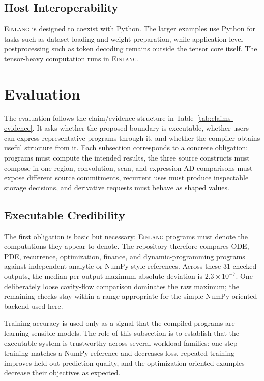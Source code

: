 \documentclass[sigplan,screen,nonacm]{acmart}
\newcommand{\einlang}{\textsc{Einlang}}
\begin{document}
\subsection{Host Interoperability}

\einlang{} is designed to coexist with Python. The larger examples use Python for tasks such as dataset loading and weight preparation, while application-level postprocessing such as token decoding remains outside the tensor core itself. The tensor-heavy computation runs in \einlang{}.

\section{Evaluation}

The evaluation follows the claim/evidence structure in Table~\ref{tab:claims-evidence}. It asks whether the proposed boundary is executable, whether users can express representative programs through it, and whether the compiler obtains useful structure from it. Each subsection corresponds to a concrete obligation: programs must compute the intended results, the three source constructs must compose in one region, convolution, scan, and expression-AD comparisons must expose different source commitments, recurrent uses must produce inspectable storage decisions, and derivative requests must behave as shaped values.

\subsection{Executable Credibility}

The first obligation is basic but necessary: \einlang{} programs must denote the computations they appear to denote. The repository therefore compares ODE, PDE, recurrence, optimization, finance, and dynamic-programming programs against independent analytic or NumPy-style references. Across these 31 checked outputs, the median per-output maximum absolute deviation is $2.3 \times 10^{-7}$. One deliberately loose cavity-flow comparison dominates the raw maximum; the remaining checks stay within a range appropriate for the simple NumPy-oriented backend used here.

Training accuracy is used only as a signal that the compiled programs are learning sensible models. The role of this subsection is to establish that the executable system is trustworthy across several workload families: one-step training matches a NumPy reference and decreases loss, repeated training improves held-out prediction quality, and the optimization-oriented examples decrease their objectives as expected.
\end{document}
